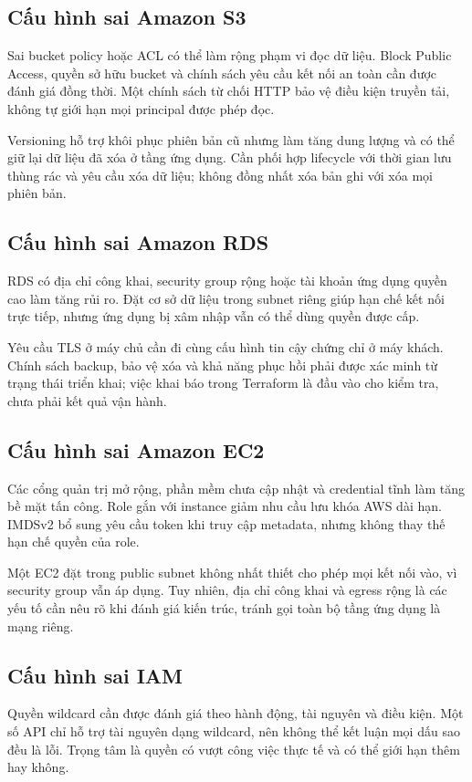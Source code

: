 \subsection{Cấu hình sai Amazon S3}
Sai bucket policy hoặc ACL có thể làm rộng phạm vi đọc dữ liệu. Block Public Access, quyền sở hữu bucket và chính sách yêu cầu kết nối an toàn cần được đánh giá đồng thời. Một chính sách từ chối HTTP bảo vệ điều kiện truyền tải, không tự giới hạn mọi principal được phép đọc.

Versioning hỗ trợ khôi phục phiên bản cũ nhưng làm tăng dung lượng và có thể giữ lại dữ liệu đã xóa ở tầng ứng dụng. Cần phối hợp lifecycle với thời gian lưu thùng rác và yêu cầu xóa dữ liệu; không đồng nhất xóa bản ghi với xóa mọi phiên bản.
\subsection{Cấu hình sai Amazon RDS}
RDS có địa chỉ công khai, security group rộng hoặc tài khoản ứng dụng quyền cao làm tăng rủi ro. Đặt cơ sở dữ liệu trong subnet riêng giúp hạn chế kết nối trực tiếp, nhưng ứng dụng bị xâm nhập vẫn có thể dùng quyền được cấp.

Yêu cầu TLS ở máy chủ cần đi cùng cấu hình tin cậy chứng chỉ ở máy khách. Chính sách backup, bảo vệ xóa và khả năng phục hồi phải được xác minh từ trạng thái triển khai; việc khai báo trong Terraform là đầu vào cho kiểm tra, chưa phải kết quả vận hành.
\subsection{Cấu hình sai Amazon EC2}
Các cổng quản trị mở rộng, phần mềm chưa cập nhật và credential tĩnh làm tăng bề mặt tấn công. Role gắn với instance giảm nhu cầu lưu khóa AWS dài hạn. IMDSv2 bổ sung yêu cầu token khi truy cập metadata, nhưng không thay thế hạn chế quyền của role.

Một EC2 đặt trong public subnet không nhất thiết cho phép mọi kết nối vào, vì security group vẫn áp dụng. Tuy nhiên, địa chỉ công khai và egress rộng là các yếu tố cần nêu rõ khi đánh giá kiến trúc, tránh gọi toàn bộ tầng ứng dụng là mạng riêng.
\subsection{Cấu hình sai IAM}
Quyền wildcard cần được đánh giá theo hành động, tài nguyên và điều kiện. Một số API chỉ hỗ trợ tài nguyên dạng wildcard, nên không thể kết luận mọi dấu sao đều là lỗi. Trọng tâm là quyền có vượt công việc thực tế và có thể giới hạn thêm hay không.

